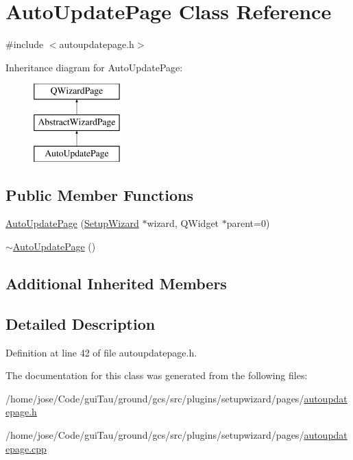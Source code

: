\hypertarget{class_auto_update_page}{\section{Auto\-Update\-Page Class Reference}
\label{class_auto_update_page}
}


{\ttfamily \#include $<$autoupdatepage.\-h$>$}

Inheritance diagram for Auto\-Update\-Page\-:\begin{figure}[H]
\begin{center}
\leavevmode
\includegraphics[height=3.000000cm]{class_auto_update_page}
\end{center}
\end{figure}
\subsection*{Public Member Functions}
\begin{DoxyCompactItemize}
\item 
\hyperlink{group___auto_update_page_gad36dc27e90157da88544e92b50f100f7}{Auto\-Update\-Page} (\hyperlink{class_setup_wizard}{Setup\-Wizard} $\ast$wizard, Q\-Widget $\ast$parent=0)
\item 
\hyperlink{group___auto_update_page_gae63f6d82a40a332f3f38aec3515b2296}{$\sim$\-Auto\-Update\-Page} ()
\end{DoxyCompactItemize}
\subsection*{Additional Inherited Members}


\subsection{Detailed Description}


Definition at line 42 of file autoupdatepage.\-h.



The documentation for this class was generated from the following files\-:\begin{DoxyCompactItemize}
\item 
/home/jose/\-Code/gui\-Tau/ground/gcs/src/plugins/setupwizard/pages/\hyperlink{autoupdatepage_8h}{autoupdatepage.\-h}\item 
/home/jose/\-Code/gui\-Tau/ground/gcs/src/plugins/setupwizard/pages/\hyperlink{autoupdatepage_8cpp}{autoupdatepage.\-cpp}\end{DoxyCompactItemize}
